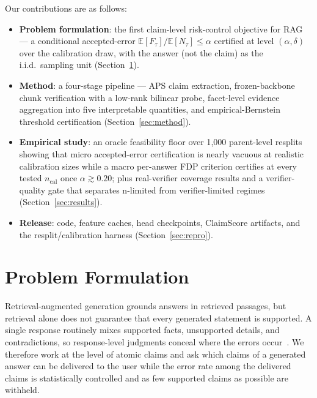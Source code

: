 \documentclass{article}
\begin{document}
Our contributions are as follows:
\begin{itemize}
  \item \textbf{Problem formulation}: the first claim-level
  risk-control objective for RAG --- a conditional accepted-error
  $\mathbb{E}[F_\tau]/\mathbb{E}[N_\tau]\le\alpha$ certified at level
  $(\alpha,\delta)$ over the calibration draw, with the answer (not the
  claim) as the i.i.d.\ sampling unit (Section~\ref{sec:problem}).
  \item \textbf{Method}: a four-stage pipeline --- APS claim extraction,
  frozen-backbone chunk verification with a low-rank bilinear probe,
  facet-level evidence aggregation into five interpretable quantities,
  and empirical-Bernstein threshold certification
  (Section~\ref{sec:method}).
  \item \textbf{Empirical study}: an oracle feasibility floor over
  1{,}000 parent-level resplits showing that micro accepted-error
  certification is nearly vacuous at realistic calibration sizes while
  a macro per-answer FDP criterion certifies at every tested
  $n_{\mathrm{cal}}$ once $\alpha\gtrsim0.20$; plus real-verifier
  coverage results and a verifier-quality gate that separates
  n-limited from verifier-limited regimes
  (Section~\ref{sec:results}).
  \item \textbf{Release}: code, feature caches, head checkpoints,
  ClaimScore artifacts, and the resplit/calibration harness
  (Section~\ref{sec:repro}).
\end{itemize}


\section{Problem Formulation}
\label{sec:problem}

Retrieval-augmented generation grounds answers in retrieved passages, but
retrieval alone does not guarantee that every generated statement is
supported. A single response routinely mixes supported facts, unsupported
details, and contradictions, so response-level judgments conceal where the
errors occur~\cite{min2023factscore,wei2024longfact,song2024veriscore,akbar2024hallumeasure,niu2024ragtruth}. We therefore work at the level
of atomic claims and ask which claims of a generated answer can be delivered
to the user while the error rate among the delivered claims is
statistically controlled and as few supported claims as possible are withheld.
\end{document}
